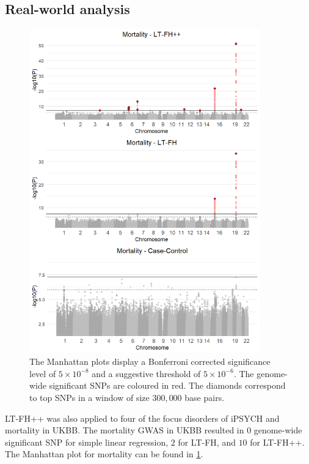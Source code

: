 \subsection{Real-world analysis}
\begin{figure}
	\includegraphics[width=10cm]{results/manhattanPlot_mortality.png}
	\caption[Manhattan plots for LT-FH++, LT-FH, and case-control GWAS of mortality	in the UK Biobank]{The Manhattan plots display a Bonferroni corrected significance level of $ 5\times 10^{-8} $ and a suggestive threshold of $ 5\times 10^{-6} $. The genome-wide significant SNPs are coloured in red. The diamonds correspond to top	SNPs in a window of size $ 300,000 $ base pairs.}
	\label{fig:LTFH++_manhattanMortality}
\end{figure}
LT-FH++ was also applied to four of the focus disorders of iPSYCH and mortality in UKBB. The mortality GWAS in UKBB resulted in $ 0 $ genome-wide significant SNP for simple linear regression, $ 2 $ for LT-FH, and $ 10 $ for LT-FH++. The Manhattan plot for mortality can be found in \cref{fig:LTFH++_manhattanMortality}.

